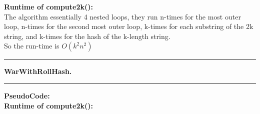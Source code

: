 \documentclass[11pt]{article}
\newcommand\question[2]{\vspace{.25in}\hrule\textbf{#1. #2}\vspace{.5em}\hrule\vspace{.10in}}
\begin{document}
\textbf{Runtime of compute2k():}\\
The algorithm essentially 4 nested loops, they run n-times for the most outer loop, n-times for the second most outer loop, k-times for each substring of the 2k string, and k-times for the hash of the k-length string.\\
So the run-time is $O(k^2n^2)$


\question{WarWithRollHash}{}

\textbf{PseudoCode:}\\

\textbf{Runtime of compute2k():}\\
\end{document}
